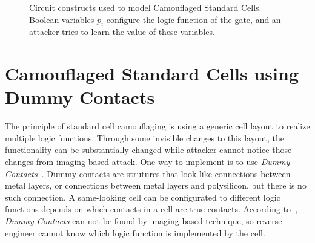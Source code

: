 \documentclass[thesis]{umassthesis}  %
\begin{document}
  \begin{figure}[!ht]
  \centering
    \caption{Circuit constructs used to model Camouflaged Standard Cells. Boolean variables $p_i$ configure the logic function of the gate, and an attacker tries to learn the value of these variables.}
    \label{fig:select}
  \end{figure}























\section{Camouflaged Standard Cells using Dummy Contacts}

The principle of standard cell camouflaging is using a generic cell layout to realize multiple logic functions. Through some invisible changes to this layout, the functionality can be substantially changed while attacker cannot notice those changes from imaging-based attack. One way to implement is to use \textit{Dummy Contacts}~\cite{chow-2007-integrated}. Dummy contacts are strutures that look like connections between metal layers, or connections between metal layers and polysilicon, but there is no such connection. A same-looking cell can be configurated to different logic functions depends on which contacts in a cell are true contacts. According to~\cite{chow-2007-integrated}, \textit{Dummy Contacts} can not be found by imaging-based technique, so reverse engineer cannot know which logic function is implemented by the cell.
\end{document}

